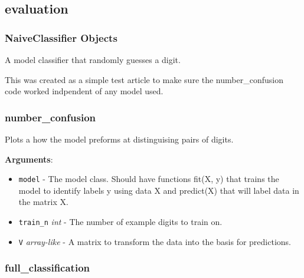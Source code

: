\subsection{evaluation}

\subsubsection{NaiveClassifier Objects}

\begin{Shaded}
\begin{Highlighting}[]
\end{Highlighting}
\end{Shaded}

A model classifier that randomly guesses a digit.

This was created as a simple test article to make sure the
number\_confusion code worked indpendent of any model used.

\subsubsection{number\_confusion}

\begin{Shaded}
\begin{Highlighting}[]
\end{Highlighting}
\end{Shaded}

Plots a how the model preforms at distinguising pairs of digits.

\textbf{Arguments}:

\begin{itemize}
\tightlist
\item
  \texttt{model} - The model class. Should have functions fit(X, y) that
  trains the model to identify labels y using data X and predict(X) that
  will label data in the matrix X.
\item
  \texttt{train\_n} \emph{int} - The number of example digits to train
  on.
\item
  \texttt{V} \emph{array-like} - A matrix to transform the data into the
  basis for predictions.
\end{itemize}

\subsubsection{full\_classification}


